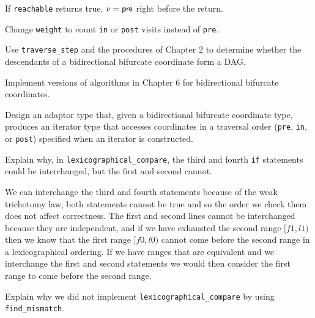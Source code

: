 \begin{lemma}
	If \verb|reachable| returns true, $v = \mathsf{pre}$ right before the return.
\end{lemma}

\begin{exercise}
	Change \verb|weight| to count \verb|in| or \verb|post| visits instead of \verb|pre|.
\end{exercise}



\begin{exercise}
	Use \verb|traverse_step| and the procedures of Chapter 2 to determine whether the
	descendants of a bidirectional bifurcate coordinate form a DAG.
\end{exercise}



\begin{project}
	Implement versions of algorithms in Chapter 6 for bidirectional bifurcate coordinates.
\end{project}

\begin{project}
	Design an adaptor type that, given a bidirectional bifurcate coordinate type, produces an iterator type
	that accesses coordinates in a traversal order (\verb|pre|, \verb|in|, or \verb|post|) specified when an
	iterator is constructed.
\end{project}

\begin{exercise}
	Explain why, in \verb|lexicographical_compare|, the third and fourth \verb|if| statements could be
	interchanged, but the first and second cannot.
\end{exercise}

\begin{solution}
	We can interchange the third and fourth statements because of the weak trichotomy law, both statements
	cannot be true and so the order we check them does not affect correctness. The first and second lines
	cannot be interchanged because they are independent, and if we have exhausted the second range $[f1, l1)$
	then we know that the first range $[f0, l0)$ cannot come before the second range in a lexicographical
	ordering. If we have ranges that are equivalent and we interchange the first and second statements we would
	then consider the first range to come before the second range.
\end{solution}

\begin{exercise}
	Explain why we did not implement \verb|lexicographical_compare| by using \verb|find_mismatch|.
\end{exercise}
